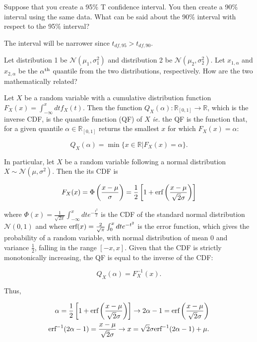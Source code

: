 \documentclass{homework}
\begin{document}
\begin{tcolorbox}[title=Question 6]
Suppose that you create a 95\% T confidence interval. You then create a 90\% interval using the same data. What can be said about the 90\% interval with respect to the 95\% interval?
\end{tcolorbox}

The interval will be narrower since $t_{df, 95} > t_{df, 90}$. \\

\begin{tcolorbox}[title=Question 7]
Let distribution 1 be $\mathcal{N}(\mu_1, \sigma_1^2)$ and distribution 2 be $\mathcal{N}(\mu_2,\sigma_2^2)$. Let $x_{1,\alpha}$ and $x_{2,\alpha}$ be the $\alpha^{\textnormal{th}}$ quantile from the two distributions, respectively. How are the two mathematically related?
\end{tcolorbox}

Let $X$ be a random variable with a cumulative distribution function $F_{X}(x) = \int_{-\infty}^{x}dt f_{X}(t)$. Then the function $Q_{X}(\alpha):\mathds{R}_{[0,1]}\rightarrow\mathds{R}$, which is the inverse CDF, is the quantile function (QF) of $X$ \textit{ie.} the QF is the function that, for a given quantile $\alpha \in \mathds{R}_{[0,1]}$ returns the smallest $x$ for which $F_{X}(x)=\alpha$:

$$
Q_{X}(\alpha) = \min \{x \in \mathds{R} | F_{X}(x) = \alpha\}.
$$

In particular, let $X$ be a random variable following a normal distribution $X \sim \mathcal{N}(\mu, \sigma^2)$. Then the its CDF is 

$$
F_{X}(x) = \Phi\left(\frac{x-\mu}{\sigma}\right) = \frac{1}{2}\left[1+\textnormal{erf}\left(\frac{x-\mu}{\sqrt{2}\sigma}\right)\right]
$$

where $\Phi(x) = \frac{1}{\sqrt{2\pi}}\int_{-\infty}^{x} dt e^{-\frac{t^2}{2}}$ is the CDF of the standard normal distribution $\mathcal{N}(0,1)$ and where $\textnormal{erf}(x) = \frac{2}{\sqrt{\pi}} \int_{0}^{x}dt e^{-t^2}$ is the error function, which gives the probability of a random variable, with normal distribution of mean 0 and variance $\frac{1}{2}$, falling in the range $[-x,x]$. Given that the CDF is strictly monotonically increasing, the QF is equal to the inverse of the CDF:

$$
Q_{X}(\alpha) = F_{X}^{-1}(x).
$$

Thus, 

\begin{align*}
    \alpha =  \frac{1}{2}\left[1+\textnormal{erf}\left(\frac{x-\mu}{\sqrt{2}\sigma}\right)\right] \rightarrow 2\alpha - 1 = \textnormal{erf}\left(\frac{x-\mu}{\sqrt{2}\sigma}\right) \\
    \textnormal{erf}^{-1}(2\alpha-1) = \frac{x-\mu}{\sqrt{2}\sigma} \rightarrow x = \sqrt{2}\sigma \textnormal{erf}^{-1}(2\alpha-1) + \mu. 
\end{align*}
\end{document}

